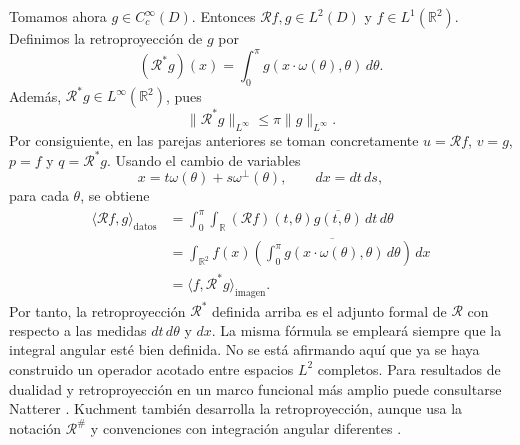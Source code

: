 Tomamos ahora $g\in C_c^\infty(D)$. Entonces $\mathcal Rf,g\in L^2(D)$ y $f\in L^1(\mathbb R^2)$. Definimos la retroproyección de $g$ por
\[
(\mathcal R^*g)(x)
=
\int_0^\pi
g(x\cdot\omega(\theta),\theta)\,d\theta.
\]
Además, $\mathcal R^*g\in L^\infty(\mathbb R^2)$, pues
\[
\|\mathcal R^*g\|_{L^\infty}
\leq
\pi\|g\|_{L^\infty}.
\]
Por consiguiente, en las parejas anteriores se toman concretamente $u=\mathcal Rf$, $v=g$, $p=f$ y $q=\mathcal R^*g$. Usando el cambio de variables
\[
x=t\omega(\theta)+s\omega^\perp(\theta),
\qquad dx=dt\,ds,
\]
para cada $\theta$, se obtiene
\[
\begin{aligned}
\langle\mathcal Rf,g\rangle_{\mathrm{datos}}
&=
\int_0^\pi\int_{\mathbb R}
(\mathcal Rf)(t,\theta)
\overline{g(t,\theta)}\,dt\,d\theta \\
&=
\int_{\mathbb R^2}
f(x)
\overline{
\left(
\int_0^\pi
g(x\cdot\omega(\theta),\theta)\,d\theta
\right)}\,dx \\
&=
\langle f,\mathcal R^*g\rangle_{\mathrm{imagen}}.
\end{aligned}
\]
Por tanto, la retroproyección $\mathcal R^*$ definida arriba es el adjunto formal de $\mathcal R$ con respecto a las medidas $dt\,d\theta$ y $dx$. La misma fórmula se empleará siempre que la integral angular esté bien definida. No se está afirmando aquí que ya se haya construido un operador acotado entre espacios $L^2$ completos. Para resultados de dualidad y retroproyección en un marco funcional más amplio puede consultarse Natterer \cite[Sec.~II.1, Thm.~1.3, pp.~13--15]{natterer2001}. Kuchment también desarrolla la retroproyección, aunque usa la notación $\mathcal R^\#$ y convenciones con integración angular diferentes \cite[Sec.~5.6, pp.~34--36]{kuchment2014}.
